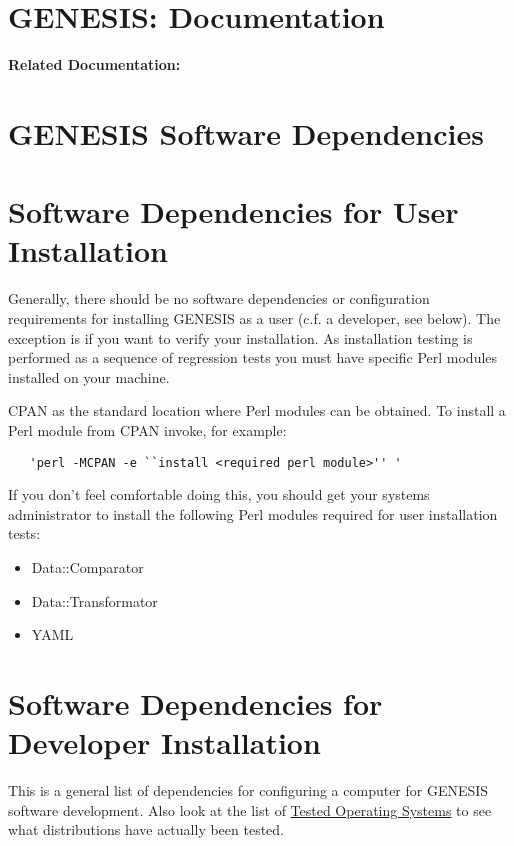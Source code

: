 \documentclass[12pt]{article}
\begin{document}
\section*{GENESIS: Documentation}

{\bf Related Documentation:}

\section*{GENESIS Software Dependencies}

\section*{Software Dependencies for User Installation}

Generally, there should be no software dependencies or configuration requirements for installing GENESIS as a user (c.f. a developer, see below). The exception is if you want to verify your installation. As installation testing is performed as a sequence of regression tests you must have specific Perl modules installed on your machine.

CPAN as the standard location where Perl modules can be obtained. To install a Perl module from CPAN invoke, for example: 
\begin{verbatim}
   'perl -MCPAN -e ``install <required perl module>'' '
\end{verbatim}

If you don't feel comfortable doing this, you should get your systems administrator to install the following Perl modules required for user installation tests: 

\begin{itemize}
   \item[]Data::Comparator
   \item[]Data::Transformator
   \item[]YAML
\end{itemize}

\section*{Software Dependencies for Developer Installation}

This is a general list of dependencies for configuring a computer for
GENESIS software development.  Also look at the list of \href{../tested-distributions/tested-distributions.tex}{Tested Operating Systems} to see what distributions have actually
been tested.
\end{document}

